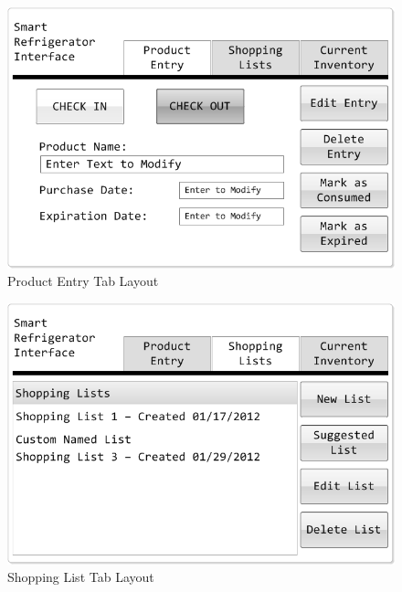 \documentclass[11pt]{article} %
\begin{document}
\begin{figure}[h!]
\begin{center}
\includegraphics[scale=0.5]{MockUp1}
\caption{Product Entry Tab Layout}
\label{mock1}
\end{center}
\end{figure}

\begin{figure}[h!]
\begin{center}
\includegraphics[scale=0.5]{MockUp2}
\caption{Shopping List Tab Layout}
\label{mock2}
\end{center}
\end{figure}
\end{document}
